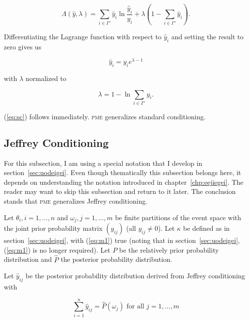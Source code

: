 \documentclass[phd,12pt,oneside]{ubcthesis}
\begin{document}
\begin{equation}
  \label{eq:sclag}
  \Lambda(\hat{y},\lambda)=\sum_{i\in{}I''}\hat{y}_{i}\ln\frac{\hat{y}_{i}}{y_{i}}+\lambda\left(1-\sum_{i\in{}I''}\hat{y}_{i}\right).
\end{equation}

{\noindent}Differentiating the Lagrange function with respect to $\hat{y}_{i}$ and
setting the result to zero gives us

\begin{equation}
  \label{eq:sc1}
  \hat{y}_{i}=y_{i}e^{\lambda-1}
\end{equation}

{\noindent}with $\lambda$ normalized to

\begin{equation}
  \label{eq:sc2}
  \lambda=1-\ln{}\sum_{i\in{}I''}y_{i}.
\end{equation}

{\noindent}(\ref{eq:sc}) follows immediately. \textsc{pme} generalizes standard conditioning.

\subsection{Jeffrey Conditioning}
\label{subsec:ukotooje}

For this subsection, I am using a special notation that I develop in
section~\ref{sec:uodeigei}. Even though thematically this subsection
belongs here, it depends on understanding the notation introduced in
chapter~\ref{chp:eejiegei}. The reader may want to skip this
subsection and return to it later. The conclusion stands that
\textsc{pme} generalizes Jeffrey conditioning. 

Let $\theta_{i},i=1,\ldots,n$ and $\omega_{j},j=1,\ldots,m$ be finite
partitions of the event space with the joint prior probability matrix
$(y_{ij})$ (all $y_{ij}\neq{}0$). Let $\kappa$ be defined as in
section~\ref{sec:uodeigei}, with (\ref{eq:m1}) true (noting that in
section~\ref{sec:uodeigei}, (\ref{eq:m1}) is no longer required). Let
$P$ be the relatively prior probability distribution and $\hat{P}$ the
posterior probability distribution.

Let $\hat{y}_{ij}$ be the posterior probability distribution derived
from Jeffrey conditioning with

\begin{equation}
  \label{eq:jc1}
  \sum_{i=1}^{n}\hat{y}_{ij}=\hat{P}(\omega_{j})\mbox{ for all }j=1,\ldots,m
\end{equation}
\end{document}

